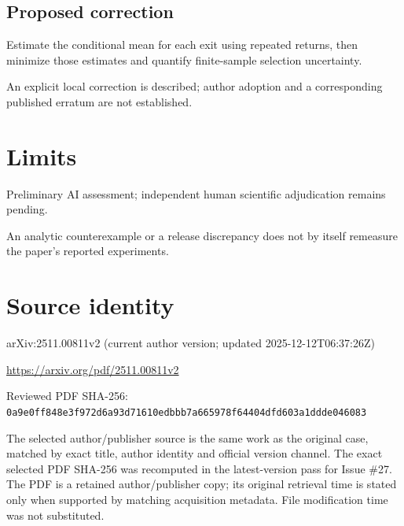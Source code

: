 \documentclass[11pt]{article}
\begin{document}
\subsection*{Proposed correction}

Estimate the conditional mean for each exit using repeated returns, then minimize those estimates and quantify finite-sample selection uncertainty.

An explicit local correction is described; author adoption and a corresponding published erratum are not established.

\section*{Limits}

Preliminary AI assessment; independent human scientific adjudication remains pending.\par

An analytic counterexample or a release discrepancy does not by itself remeasure the paper’s reported experiments.\par

\section*{Source identity}

arXiv:2511.00811v2 (current author version; updated 2025-12-12T06:37:26Z)

\url{https://arxiv.org/pdf/2511.00811v2}

Reviewed PDF SHA-256: \nolinkurl{0a9e0ff848e3f972d6a93d71610edbbb7a665978f64404dfd603a1ddde046083}

The selected author/publisher source is the same work as the original case, matched by exact title, author identity and official version channel. The exact selected PDF SHA-256 was recomputed in the latest-version pass for Issue \#27. The PDF is a retained author/publisher copy; its original retrieval time is stated only when supported by matching acquisition metadata. File modification time was not substituted.
\end{document}
